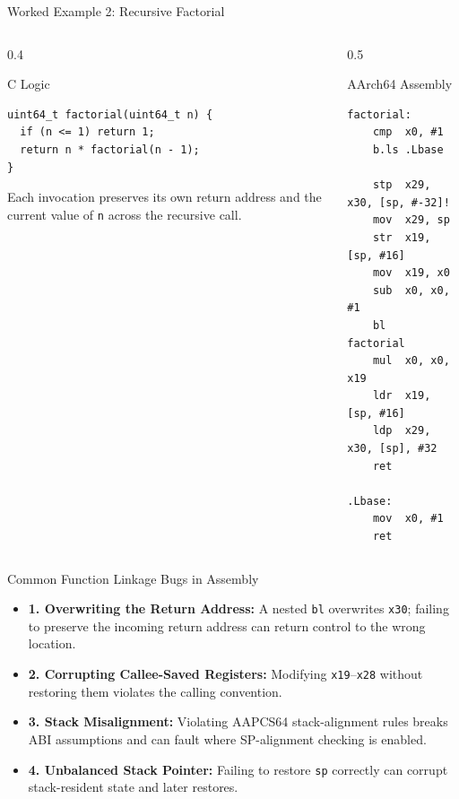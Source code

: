 \documentclass[aspectratio=169,11pt,t]{beamer}
\newcommand{\key}[1]{\textbf{#1}}
\newcommand{\bits}[1]{\texttt{#1}}
\newcommand{\code}[1]{\texttt{#1}}
\begin{document}
\begin{frame}[fragile]{Worked Example 2: Recursive Factorial}
\vspace{-0.2cm}
\begin{columns}[T,onlytextwidth]
\begin{column}{0.4\textwidth}
\begin{block}{C Logic}
\footnotesize
\begin{verbatim}
uint64_t factorial(uint64_t n) {
  if (n <= 1) return 1;
  return n * factorial(n - 1);
}
\end{verbatim}
\end{block}
\vspace{0.07cm}
\footnotesize
Each invocation preserves its own return address and the current value of \code{n} across the recursive call.
\end{column}
\begin{column}{0.5\textwidth}
\begin{block}{AArch64 Assembly}
\scriptsize
\begin{verbatim}
factorial:
    cmp  x0, #1
    b.ls .Lbase

    stp  x29, x30, [sp, #-32]!
    mov  x29, sp
    str  x19, [sp, #16]
    mov  x19, x0
    sub  x0, x0, #1
    bl   factorial
    mul  x0, x0, x19
    ldr  x19, [sp, #16]
    ldp  x29, x30, [sp], #32
    ret

.Lbase:
    mov  x0, #1
    ret
\end{verbatim}
\end{block}
\end{column}
\end{columns}
\end{frame}


\begin{frame}{Common Function Linkage Bugs in Assembly}
\begin{itemize}\setlength{\itemsep}{5pt}
  \item \key{1. Overwriting the Return Address:} A nested \code{bl} overwrites \bits{x30}; failing to preserve the incoming return address can return control to the wrong location.
  \item \key{2. Corrupting Callee-Saved Registers:} Modifying \bits{x19}--\bits{x28} without restoring them violates the calling convention.
  \item \key{3. Stack Misalignment:} Violating AAPCS64 stack-alignment rules breaks ABI assumptions and can fault where SP-alignment checking is enabled.
  \item \key{4. Unbalanced Stack Pointer:} Failing to restore \bits{sp} correctly can corrupt stack-resident state and later restores.
\end{itemize}
\end{frame}
\end{document}
